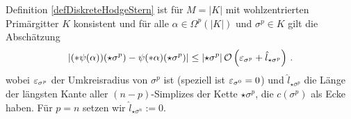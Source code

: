   \begin{lemma}
    \label{lemmaKonsistenzHodge}
    Definition \ref{defDiskreteHodgeStern} ist für \( M=|K| \) mit wohlzentrierten Primärgitter \( K \) konsistent und
    für alle \( \alpha\in\Omega^{p}(|K|) \) und \( \sigma^{p}\in K \) gilt die Abschätzung
    \begin{align}
      \label{eqKonsistenzHodge}
      \left| (*\psi(\alpha))(\star\sigma^{p}) - \psi(*\alpha)(\star\sigma^{p})\right| \le \left| \star\sigma^{p} \right| \mathcal{O}\left(\varepsilon_{\sigma^{p}} + \hat{l}_{\star\sigma^{p}}\right) \,\text{.}
    \end{align}
    wobei \( \varepsilon_{\sigma^{p}} \) der Umkreisradius von \( \sigma^{p} \) ist (speziell ist \( \varepsilon_{\sigma^{0}} = 0 \)) 
    und  \( \hat{l}_{\star\sigma^{p}} \) die Länge der längsten Kante aller \( (n-p) \)-Simplizes der Kette \( \star\sigma^{p} \), 
    die \( c(\sigma^{p}) \) als Ecke haben. Für \( p=n \) setzen wir \( \hat{l}_{\star\sigma^{n}}:=0 \).
  \end{lemma}
